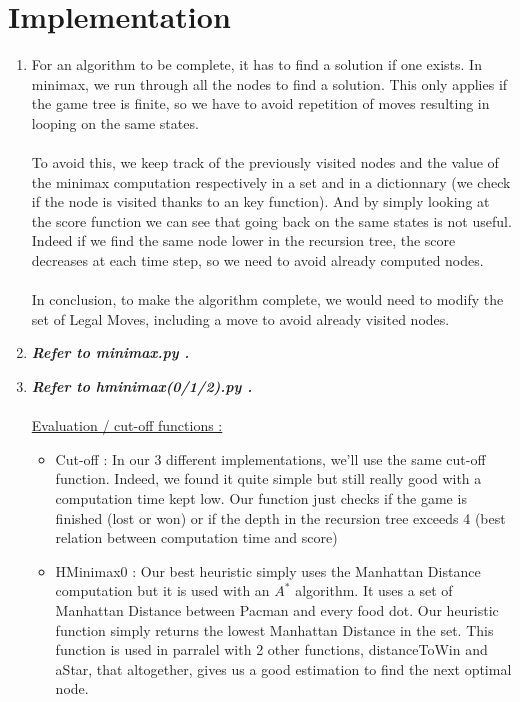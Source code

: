 \documentclass{article}
\begin{document}
\section{Implementation}

\begin{enumerate}[label=\alph*.,leftmargin=*]
    \item For an algorithm to be complete, it has to find a solution if one exists. In minimax, we run through all the nodes to find a solution. This only applies if the game tree is finite, so we have to avoid repetition of moves resulting in looping on the same states.
    \\\\
    To avoid this, we keep track of the previously visited nodes and the value of the minimax computation respectively in a set and in a dictionnary (we check if the node is visited thanks to an key function). And by simply looking at the score function we can see 
    that going back on the same states is not useful. Indeed if we find the same node lower in the recursion tree, the score decreases at each time step, so we need to avoid already computed nodes.
    \\\\
    In conclusion, to make the algorithm complete, we would need to modify the set of Legal Moves, including a move to avoid already visited nodes.
    \item \textbf{\textit{Refer to minimax.py .}}
    \item \textbf{\textit{Refer to hminimax(0/1/2).py .}}
    \\\\\underline{Evaluation / cut-off functions :}
    \begin{itemize}
        \item Cut-off : In our 3 different implementations, we'll use the same cut-off function. Indeed, we found it quite simple but still really good with a computation time kept low. 
        Our function just checks if the game is finished (lost or won) or if the depth in the recursion tree exceeds 4 (best relation between computation time and score)
        \item HMinimax0 : Our best heuristic simply uses the Manhattan Distance computation but it is used with an $A^*$ algorithm. It uses a set of Manhattan Distance between Pacman and every food dot.
        Our heuristic function simply returns the lowest Manhattan Distance in the set. This function is used in parralel with 2 other functions, distanceToWin and aStar, that  altogether, gives us a good estimation to find the next optimal node.

\end{itemize}
\end{enumerate}
\end{document}
